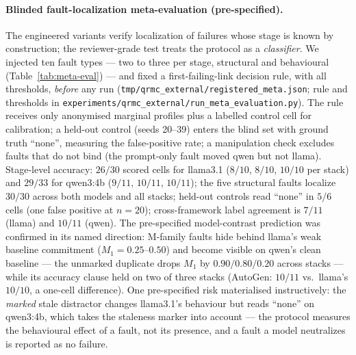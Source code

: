 \documentclass{article}
\begin{document}
\paragraph{Blinded fault-localization meta-evaluation (pre-specified).}
The engineered variants verify localization of failures whose stage
is known by construction; the reviewer-grade test treats the protocol
as a \emph{classifier}. We injected ten fault types --- two to three
per stage, structural and behavioural (Table~\ref{tab:meta-eval}) ---
and fixed a first-failing-link decision rule, with all thresholds,
\emph{before} any run (\texttt{tmp/qrmc\_external/registered\_meta.json};
rule and thresholds in
\texttt{experiments/qrmc\_external/run\_meta\_evaluation.py}). The
rule receives only anonymised marginal profiles plus a labelled
control cell for calibration; a held-out control (seeds 20--39)
enters the blind set with ground truth ``none'', measuring the
false-positive rate; a manipulation check excludes faults that do not
bind (the prompt-only fault moved qwen but not llama). Stage-level
accuracy: $26/30$ scored cells for llama3.1 ($8/10$, $8/10$, $10/10$
per stack) and $29/33$ for qwen3:4b ($9/11$, $10/11$, $10/11$); the
five structural faults localize $30/30$ across both models and all
stacks; held-out controls read ``none'' in $5/6$ cells (one false
positive at $n{=}20$); cross-framework label agreement is $7/11$
(llama) and $10/11$ (qwen). The pre-specified model-contrast prediction
was confirmed in its named direction: M-family faults hide behind
llama's weak baseline commitment ($M_1{=}0.25$--$0.50$) and become
visible on qwen's clean baseline --- the unmarked duplicate drops
$M_1$ by $0.90/0.80/0.20$ across stacks --- while its accuracy clause
held on two of three stacks (AutoGen: $10/11$ vs.\ llama's $10/10$,
a one-cell difference). One pre-specified risk materialised
instructively: the \emph{marked} stale distractor changes llama3.1's behaviour but
reads ``none'' on qwen3:4b, which takes the staleness marker into
account --- the protocol measures the behavioural effect of a fault,
not its presence, and a fault a model neutralizes is reported as no
failure.
\end{document}
